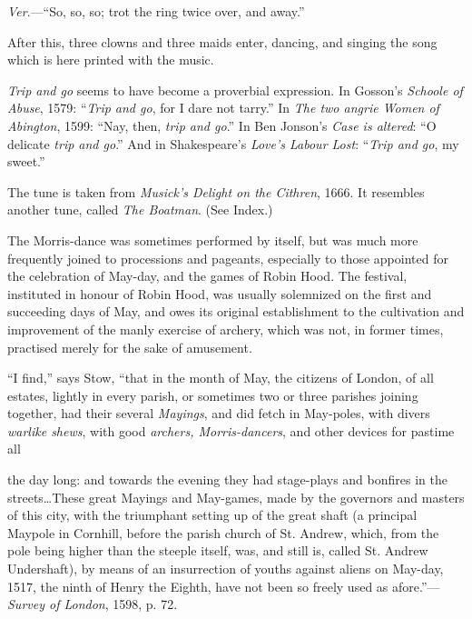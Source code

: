 \textit{Ver}.—“So, so, so; trot the ring twice over, and away.”

After this, three clowns and three maids enter, dancing, and singing the song
which is here printed with the music.

\textit{Trip and go} seems to have become a proverbial expression. In Gosson’s \textit{Schoole
of Abuse}, 1579: “\textit{Trip and go}, for I dare not tarry.” In \textit{The two angrie Women
of Abington}, 1599: “Nay, then, \textit{trip and go}.” In Ben Jonson’s \textit{Case is altered}:
“O delicate \textit{trip and go}.” And in Shakespeare’s \textit{Love's Labour Lost}: “\textit{Trip
and go}, my sweet.”

The tune is taken from \textit{Musick's Delight on the Cithren}, 1666. It resembles
another tune, called \textit{The Boatman}. (See Index.)



The Morris-dance was sometimes performed by itself, but was much more
frequently joined to processions and pageants, especially to those appointed for
the celebration of May-day, and the games of Robin Hood. The festival, instituted
in honour of Robin Hood, was usually solemnized on the first and
succeeding days of May, and owes its original establishment to the cultivation
and improvement of the manly exercise of archery, which was not, in former
times, practised merely for the sake of amusement.


“I find,” says Stow, “that in the month of May, the citizens of London, of all
estates, lightly in every parish, or sometimes two or three parishes joining
together, had their several \textit{Mayings}, and did fetch in May-poles, with divers
\textit{warlike shews}, with good \textit{archers, Morris-dancers}, \pagebreak and other devices for pastime all
the day long: and towards the evening they had stage-plays and bonfires in the
streets\ldots These great Mayings and May-games, made by the governors and
masters of this city, with the triumphant setting up of the great shaft (a principal
Maypole in Cornhill, before the parish church of St. Andrew, which, from the pole
being higher than the steeple itself, was, and still is, called St. Andrew Undershaft), 
by means of an insurrection of youths against aliens on May-day, 1517,
 the
ninth of Henry the Eighth, have not been so freely used as afore.”—\textit{Survey of
London}, 1598, p. 72.

